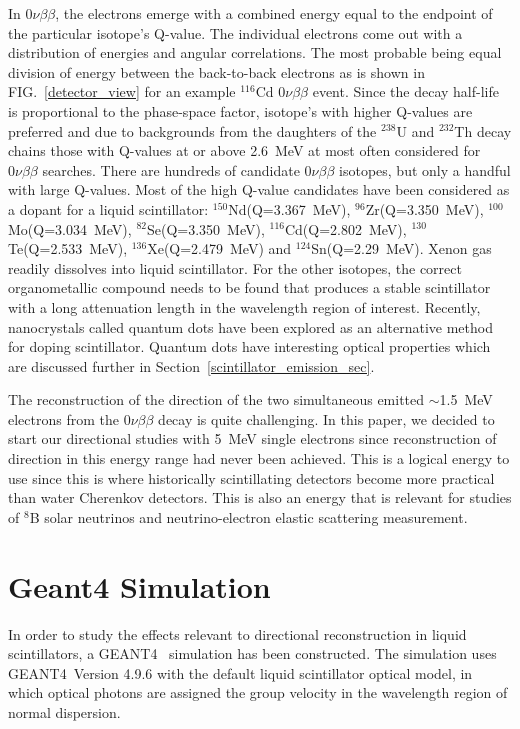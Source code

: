 \documentclass[aps,prc,twocolumn,groupedaddress,showpacs,amsmath,amssymb,floatfix,superscriptaddress]{revtex4}
\newcommand{\GEANT}{GEANT4}
\begin{document}
In $0\nu\beta\beta$, the electrons emerge with a combined energy equal to the endpoint of the particular isotope's Q-value. The individual electrons come out with a distribution of energies and angular correlations. The most probable being equal division of energy between the back-to-back electrons\cite{phasespace} as is shown in FIG.~\ref{detector_view} for an example $^{116}$Cd $0\nu\beta\beta$ event. Since the decay half-life is proportional to the phase-space factor, isotope's with higher Q-values are preferred and due to backgrounds from the daughters of the $^{238}$U and $^{232}$Th decay chains those with Q-values at or above 2.6~MeV at most often considered for $0\nu\beta\beta$ searches. There are hundreds of candidate $0\nu\beta\beta$ isotopes\cite{tabledbb}, but only a handful with large Q-values.  Most of the high Q-value candidates have been considered as a dopant for a liquid scintillator: $^{150}$Nd(Q=3.367~MeV)\cite{minfang,nd1}, $^{96}$Zr(Q=3.350~MeV)\cite{zr1},  $^{100}$Mo(Q=3.034~MeV)\cite{mo1}, $^{82}$Se(Q=3.350~MeV)\cite{qdot}, $^{116}$Cd(Q=2.802~MeV)\cite{qdot, cd1}, $^{130}$Te(Q=2.533~MeV)\cite{qdot, biller}, $^{136}$Xe(Q=2.479~MeV)\cite{KZ0nu} and $^{124}$Sn(Q=2.29~MeV)\cite{sn1}. Xenon gas readily dissolves into liquid scintillator. For the other isotopes, the correct organometallic compound needs to be found that produces a stable scintillator with a long attenuation length in the wavelength region of interest. Recently, nanocrystals called quantum dots have been explored as an alternative method for doping scintillator\cite{qdot}. Quantum dots have interesting optical properties which are discussed further in Section~\ref{scintillator_emission_sec}.

The reconstruction of the direction of the two simultaneous emitted $\sim$1.5~MeV electrons from the $0\nu\beta\beta$ decay is quite challenging. In this paper, we decided to start our directional studies with 5~MeV single electrons since reconstruction of direction in this energy range had never been achieved. This is a logical energy to use since this is where historically scintillating detectors become more practical than water Cherenkov detectors.  This is also an energy that is relevant for studies of $^{8}$B solar neutrinos and neutrino-electron elastic scattering measurement.



\section{Geant4 Simulation}
In order to study the effects relevant to directional
reconstruction in liquid scintillators, a 
\GEANT~\cite{geant4one,geant4two} simulation has been constructed. The 
simulation uses \GEANT~Version 4.9.6 with the default liquid scintillator optical model, in which optical photons are
assigned the group velocity in the wavelength region of normal
dispersion.
\end{document}
